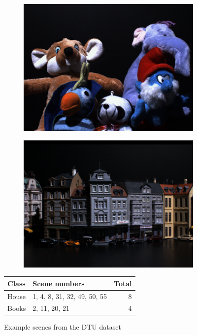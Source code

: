 \documentclass[thesis.tex]{subfiles}
\begin{document}
\begin{figure}[p]
\begin{subfigure}{0.49\textwidth}
		\includegraphics[width=\textwidth]{img/dtu_example_3.png}
	\end{subfigure}
	\hfill
	\begin{subfigure}{0.49\textwidth}
		\includegraphics[width=\textwidth]{img/dtu_example_4.png}
	\end{subfigure}
	\caption{Example scenes from the DTU dataset}
	\label{fig:dtu_examples}
%
\vspace{1cm}
%
	\centering
	\begin{tabular}{l l r}
		\toprule
		Class & Scene numbers & Total \\
		\midrule
		House					& 1, 4, 8, 31, 32, 49, 50, 55				& 8 \\
		Books					& 2, 11, 20, 21								& 4 \\

\end{tabular}
\end{figure}
\end{document}
